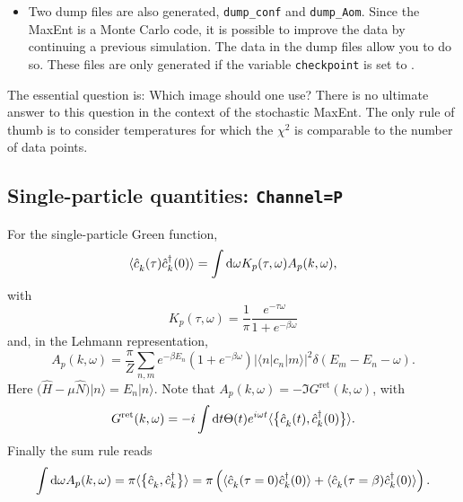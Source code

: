 \begin{itemize}
\item Two dump files are also generated, \texttt{dump\_conf} and \texttt{dump\_Aom}. Since the MaxEnt is a Monte Carlo code, it is possible to improve the data by continuing a previous simulation. The data in the dump files allow you to do so. These files are only generated if the variable \texttt{checkpoint} is set to . 

\end{itemize}

The essential question is: Which image should one use? There is no ultimate answer to this question in the context of the stochastic MaxEnt. The only rule of thumb is to consider temperatures for which the \( \chi^2 \) is  comparable to the number of data points.


\subsection{Single-particle quantities: \texttt{Channel=P}}
For the single-particle Green function, 
\begin{equation} 
	\langle \hat{c}^{\phantom\dagger}_{k} (\tau)  \hat{c}^{\dagger}_{k} (0)   \rangle   = \int \d \omega  K_p(\tau,\omega)   A_p(k, \omega) ,
\end{equation}
with 
\begin{equation}
K_{p}(\tau,\omega) =    \frac{1}{\pi} \frac{e^{-\tau \omega} }  {  1 + e^{-\beta\omega} }
\end{equation}
and, in the Lehmann representation, 
 \begin{equation}
   A_p(k, \omega) = \frac{ \pi}{Z} \sum_{n,m} e^{-\beta E_n } \left( 1 + e^{-\beta \omega}\right) | \langle n | c_n | m  \rangle |^{2} \delta \left( E_m - E_n - \omega \right)  .
\end{equation}  
Here $ \big( \hat{H} - \mu \hat{N} \big) | n \rangle = E_n | n \rangle  $.
Note that  $ A_p(k, \omega)  = - \Im G^{\mathrm{ret}} (k, \omega) $,  with 
\begin{equation}
	G^{\mathrm{ret}} (k, \omega)  = -i \int \d t \Theta(t)  e^{i \omega t} \langle \big\{ \hat{c}^{\phantom\dagger}_{k} (t), \hat{c}^{\dagger}_{k} (0) \big\} \rangle .
\end{equation}
Finally the sum rule reads
\begin{equation}
	\int \d \omega  A_p(k, \omega)  = \pi \langle  \big\{ \hat{c}^{\phantom\dagger}_{k} , \hat{c}^{\dagger}_{k}  \big\}   \rangle = \pi \left( 
	\langle \hat{c}^{\phantom\dagger}_{k} (\tau=0)  \hat{c}^{\dagger}_{k} (0)   \rangle  +  \langle \hat{c}^{\phantom\dagger}_{k} (\tau=\beta)  \hat{c}^{\dagger}_{k} (0)   \rangle  \right).
\end{equation}
